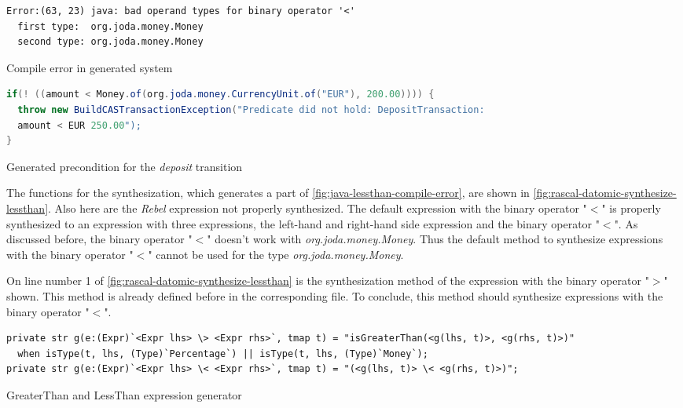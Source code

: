 \begin{sourcecode}[h!]
\begin{lstlisting}[]
Error:(63, 23) java: bad operand types for binary operator '<'
  first type:  org.joda.money.Money
  second type: org.joda.money.Money
\end{lstlisting}
\caption{Compile error in generated system}\label{fig:java-result-lessthan-compile-error}
\end{sourcecode}
\FloatBarrier

\begin{sourcecode}[h!]
\begin{lstlisting}[language=Java]
if(! ((amount < Money.of(org.joda.money.CurrencyUnit.of("EUR"), 200.00)))) {
  throw new BuildCASTransactionException("Predicate did not hold: DepositTransaction:
  amount < EUR 250.00");
}
\end{lstlisting}
\caption{Generated precondition for the \textit{deposit} transition}\label{fig:java-lessthan-compile-error}
\end{sourcecode}
\FloatBarrier

The functions for the synthesization, which generates a part of
\autoref{fig:java-lessthan-compile-error}, are shown in
\autoref{fig:rascal-datomic-synthesize-lessthan}. Also here are the \textit{Rebel}
expression not properly synthesized. The default expression with the binary
operator "$<$" is properly synthesized to an expression with three expressions,
the left-hand and right-hand side expression and the binary operator "$<$".
As discussed before, the binary operator "$<$" doesn't work with
\textit{org.joda.money.Money}. Thus the default method to synthesize expressions
with the binary operator "$<$" cannot be used for the type
\textit{org.joda.money.Money}.

On line number 1 of \autoref{fig:rascal-datomic-synthesize-lessthan} is the
synthesization method of the expression with the binary operator "$>$" shown.
This method is already defined before in the corresponding file. To conclude,
this method should synthesize expressions with the binary operator "$<$".

\begin{sourcecode}[h!]
\begin{lstlisting}[]
private str g(e:(Expr)`<Expr lhs> \> <Expr rhs>`, tmap t) = "isGreaterThan(<g(lhs, t)>, <g(rhs, t)>)"
  when isType(t, lhs, (Type)`Percentage`) || isType(t, lhs, (Type)`Money`);
private str g(e:(Expr)`<Expr lhs> \< <Expr rhs>`, tmap t) = "(<g(lhs, t)> \< <g(rhs, t)>)";
\end{lstlisting}
\caption{GreaterThan and LessThan expression generator}\label{fig:rascal-datomic-synthesize-lessthan}
\end{sourcecode}
\FloatBarrier

